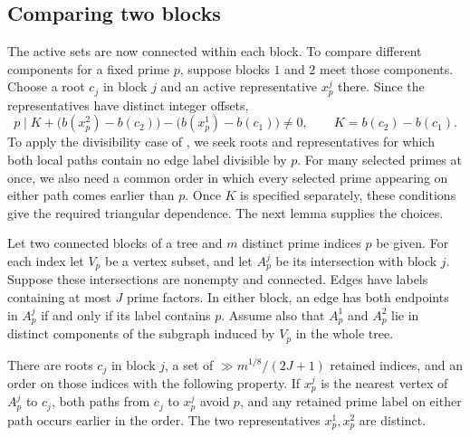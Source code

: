 \subsection{Comparing two blocks}

The active sets are now connected within each block.  To compare
different components for a fixed prime $p$, suppose blocks $1$ and
$2$ meet those components.  Choose a root $c_j$ in block $j$ and an
active representative $x_p^j$ there.  Since the representatives have
distinct integer offsets,
\begin{equation}\label{eq:two-block-constraint}
 p\mid K+\bigl(b(x_p^2)-b(c_2)\bigr)
           -\bigl(b(x_p^1)-b(c_1)\bigr)\ne0,
 \qquad K=b(c_2)-b(c_1).
\end{equation}
To apply the divisibility case of , we
seek roots and representatives for which both local paths contain
no edge label divisible by $p$.  For many selected primes at once,
we also need a common order in which every selected prime appearing
on either path comes earlier than $p$.  Once $K$ is specified separately, these
conditions give the required triangular dependence.  The next lemma
supplies the choices.

\begin{lemma}\label{lem:reroot-constraints}
Let two connected blocks of a tree and $m$ distinct prime indices
$p$ be given.  For each index let $V_p$ be a vertex subset, and let
$A_p^j$ be its intersection with block $j$.  Suppose these
intersections are nonempty and connected.  Edges have labels
containing at most $J$ prime factors.  In either block, an edge has
both endpoints in $A_p^j$ if and only if its label contains $p$.
Assume also that $A_p^1$ and $A_p^2$ lie in distinct components of
the subgraph induced by $V_p$ in the whole tree.

There are roots $c_j$ in block $j$, a set of
$\gg m^{1/8}/(2J+1)$ retained indices, and an order on those indices
with the following property.  If $x_p^j$ is the nearest vertex of
$A_p^j$ to $c_j$, both paths from $c_j$ to $x_p^j$ avoid $p$, and
any retained prime label on either path occurs earlier in the order.
The two representatives $x_p^1,x_p^2$ are distinct.
\end{lemma}

